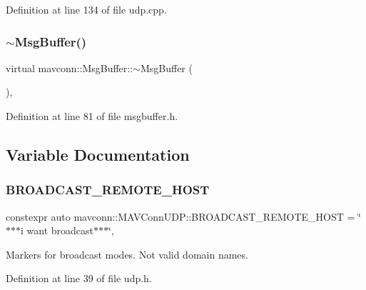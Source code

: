 Definition at line 134 of file udp.\+cpp.

\mbox{\label{group__mavconn_gac56cac6705c915b3c74c3d0b12c45939}} 
\subsubsection{\texorpdfstring{$\sim$MsgBuffer()}{~MsgBuffer()}}
{\footnotesize\ttfamily virtual mavconn\+::\+Msg\+Buffer\+::$\sim$\+Msg\+Buffer (\begin{DoxyParamCaption}{ }\end{DoxyParamCaption})\hspace{0.3cm}{\ttfamily [inline]}, {\ttfamily [virtual]}}



Definition at line 81 of file msgbuffer.\+h.



\subsection{Variable Documentation}
\mbox{\label{group__mavconn_gae78adaaf99172a7aafead43dc2883cec}} 
\subsubsection{\texorpdfstring{BROADCAST\_REMOTE\_HOST}{BROADCAST\_REMOTE\_HOST}}
{\footnotesize\ttfamily constexpr auto mavconn\+::\+M\+A\+V\+Conn\+U\+D\+P\+::\+B\+R\+O\+A\+D\+C\+A\+S\+T\+\_\+\+R\+E\+M\+O\+T\+E\+\_\+\+H\+O\+ST = \char`\"{}$\ast$$\ast$$\ast$i want broadcast$\ast$$\ast$$\ast$\char`\"{}\hspace{0.3cm}{\ttfamily [static]}, {\ttfamily [constexpr]}}



Markers for broadcast modes. Not valid domain names. 



Definition at line 39 of file udp.\+h.

\mbox{\label{group__mavconn_ga9f68651877ebc10d79f41925185d8553}} 
